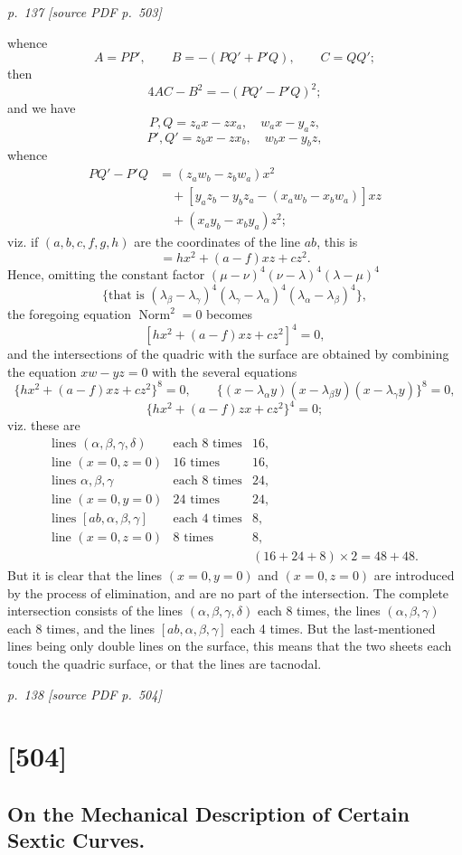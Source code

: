 \documentclass[11pt,a4paper]{article}
\newcommand{\sourcepage}[2]{%
  \bigskip
  \noindent\textit{p.~#1 [source PDF p.~#2]}%
  \par\smallskip
}
\newcommand{\papersection}[2]{%
  \section{[#1]}
  \subsection{#2}
}
\newcommand{\Norm}{\operatorname{Norm}}
\begin{document}
\sourcepage{137}{503}
whence
\[
A=PP',\qquad B=-(PQ'+P'Q),\qquad C=QQ';
\]
then
\[
4AC-B^2=-(PQ'-P'Q)^2;
\]
and we have
\[
P,Q=z_ax-zx_a,\quad w_ax-y_az,
\]
\[
P',Q'=z_bx-zx_b,\quad w_bx-y_bz,
\]
whence
\[
\begin{aligned}
PQ'-P'Q
&=(z_aw_b-z_bw_a)x^2\\
&\quad+[y_az_b-y_bz_a-(x_aw_b-x_bw_a)]xz\\
&\quad+(x_ay_b-x_by_a)z^2;
\end{aligned}
\]
viz. if $(a,b,c,f,g,h)$ are the coordinates of the line $ab$, this is
\[
=hx^2+(a-f)xz+cz^2.
\]
Hence, omitting the constant factor
$(\mu-\nu)^4(\nu-\lambda)^4(\lambda-\mu)^4$
\[
\{ \text{that is }(\lambda_\beta-\lambda_\gamma)^4
(\lambda_\gamma-\lambda_\alpha)^4
(\lambda_\alpha-\lambda_\beta)^4\},
\]
the foregoing equation $\Norm^2=0$ becomes
\[
[hx^2+(a-f)xz+cz^2]^4=0,
\]
and the intersections of the quadric with the surface are obtained by combining the
equation $xw-yz=0$ with the several equations
\[
\{hx^2+(a-f)xz+cz^2\}^8=0,\qquad
\{(x-\lambda_\alpha y)(x-\lambda_\beta y)(x-\lambda_\gamma y)\}^8=0,
\]
\[
\{hx^2+(a-f)zx+cz^2\}^4=0;
\]
viz. these are
\[
\begin{array}{rcl}
\text{lines }(\alpha,\beta,\gamma,\delta)&\text{each 8 times}&16,\\
\text{line }(x=0,z=0)&16\text{ times}&16,\\
\text{lines }\alpha,\beta,\gamma&\text{each 8 times}&24,\\
\text{line }(x=0,y=0)&24\text{ times}&24,\\
\text{lines }[ab,\alpha,\beta,\gamma]&\text{each 4 times}&8,\\
\text{line }(x=0,z=0)&8\text{ times}&8,\\
&& (16+24+8)\times2=48+48.
\end{array}
\]
But it is clear that the lines $(x=0,y=0)$ and $(x=0,z=0)$ are introduced by the
process of elimination, and are no part of the intersection. The complete intersection
consists of the lines $(\alpha,\beta,\gamma,\delta)$ each 8 times, the lines
$(\alpha,\beta,\gamma)$ each 8 times, and the lines $[ab,\alpha,\beta,\gamma]$ each
4 times. But the last-mentioned lines being only double lines on the surface, this
means that the two sheets each touch the quadric surface, or that the lines are
tacnodal.

\sourcepage{138}{504}
\papersection{504}{On the Mechanical Description of Certain Sextic Curves.}
\end{document}
